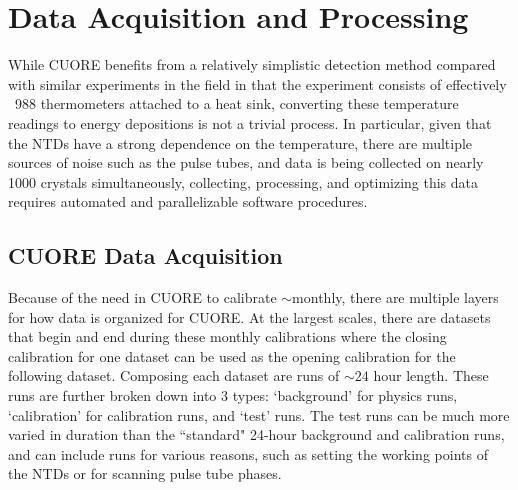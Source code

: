 \chapter{Data Acquisition and Processing}
\label{ch:Data Acquisition and Processing}

While CUORE benefits from a relatively simplistic detection method compared with similar experiments in the field in that the experiment consists of effectively ~988 thermometers attached to a heat sink, converting these temperature readings to energy depositions is not a trivial process.
In particular, given that the NTDs have a strong dependence on the temperature, there are multiple sources of noise such as the pulse tubes, and data is being collected on nearly 1000 crystals simultaneously, collecting, processing, and optimizing this data requires automated and parallelizable software procedures.

\section{CUORE Data Acquisition}
Because of the need in CUORE to calibrate $\sim$monthly, there are multiple layers for how data is organized for CUORE.
At the largest scales, there are datasets that begin and end during these monthly calibrations where the closing calibration for one dataset can be used as the opening calibration for the following dataset.
Composing each dataset are runs of $\sim24$ hour length.
These runs are further broken down into 3 types: `background' for physics runs, `calibration' for calibration runs, and `test' runs.
The test runs can be much more varied in duration than the ``standard" 24-hour background and calibration runs, and can include runs for various reasons, such as setting the working points of the NTDs or for scanning pulse tube phases.


